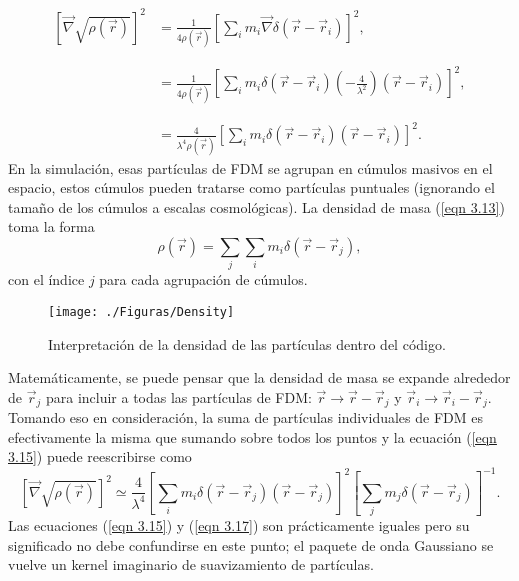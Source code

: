 \documentclass[a4paper,openright,12pt]{book}
\begin{document}
\begin{equation}
\begin{array}{ll}
\left[\vec{\nabla}\sqrt{\rho (\vec{r})}\right]^{2} &=
\frac{1}{4\rho(\vec{r})}\left[\sum_{i} m_{i}\vec{\nabla}\delta(\vec{r}-\vec{r}_{i})\right]^{2}, \\\\\\ 
&=
\frac{1}{4\rho(\vec{r})} 
\left[\sum_{i}
m_{i}\delta(\vec{r}-\vec{r}_{i})(-\frac{4}{\lambda^{2}})(\vec{r}-\vec{r}_{i})\right]^{2}, \\\\\\
&=
\frac{4}{\lambda^{4}\rho(\vec{r})}
\left[
\sum_{i} m_{i}\delta(\vec{r}-\vec{r}_{i})(\vec{r}-\vec{r}_{i})
\right]^{2}. \label{eqn 3.15}

\end{array}
\end{equation}
En la simulación, esas partículas de FDM se agrupan en cúmulos masivos en el espacio, estos cúmulos pueden tratarse como partículas puntuales (ignorando el tamaño de los cúmulos a escalas cosmológicas). La densidad de masa (\ref{eqn 3.13}) toma la forma
\begin{equation}
\rho(\vec{r})
=
\sum_{j}\sum_{i}m_{i}\delta(\vec{r}-\vec{r}_{j}),\label{eqn 3.16}
\end{equation} 
con el índice $j$ para cada agrupación de cúmulos. 

\begin{figure}
\centering
\texttt{[image: ./Figuras/Density]}
\caption{\footnotesize{Interpretación de la densidad de las partículas dentro del código.}}
\end{figure}

Matemáticamente, se puede pensar que la densidad de masa se expande alrededor de $\vec{r}_{j}$ para incluir a todas las partículas de FDM: $\vec{r} \rightarrow \vec{r}-\vec{r}_{j}$ y $\vec{r}_{i} \rightarrow \vec{r}_{i} - \vec{r}_{j}$. Tomando eso en consideración, la suma de partículas individuales de FDM es efectivamente la misma que sumando sobre todos los puntos y la ecuación (\ref{eqn 3.15}) puede reescribirse como 
\begin{equation}
\left[\vec{\nabla}\sqrt{\rho (\vec{r})}\right]^{2} \simeq 
\frac{4}{\lambda^{4}}
\left[
\sum_{i}m_{i}\delta(\vec{r}-\vec{r}_{j})(\vec{r}-\vec{r}_{j})
\right]^{2}
\left[
\sum_{j}m_{j}\delta(\vec{r}-\vec{r}_{j})
\right]^{-1}. \label{eqn 3.17}
\end{equation}
Las ecuaciones (\ref{eqn 3.15}) y (\ref{eqn 3.17}) son prácticamente iguales pero su significado no debe confundirse en este punto; el paquete de onda Gaussiano se vuelve un kernel imaginario de suavizamiento de partículas.
\end{document}
